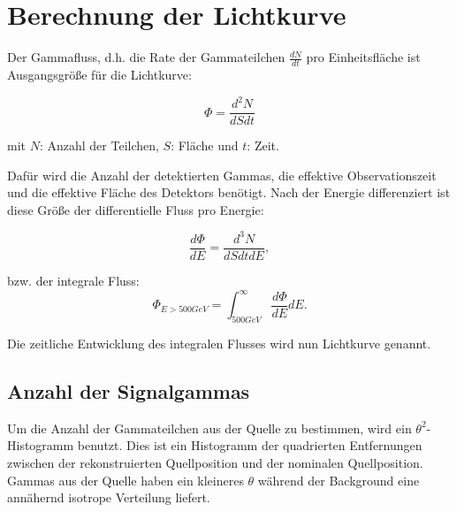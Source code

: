 \section{Berechnung der Lichtkurve}
\label{sec:Lichtkurve}
Der Gammafluss, d.h. die Rate der Gammateilchen $\frac{dN}{dt}$ pro Einheitsfläche ist Ausgangsgröße für die Lichtkurve:

\begin{equation}
 \Phi=\frac{d^2 N}{dS dt} 
\end{equation}
\begin{centering}
  \small{mit $N$: Anzahl der Teilchen, $S$: Fläche und $t$: Zeit.}
 \end{centering}
 
Dafür wird die Anzahl der detektierten Gammas, die effektive Observationszeit und die effektive Fläche des Detektors benötigt.
Nach der Energie differenziert ist diese Größe der differentielle Fluss pro Energie:

\begin{equation}
 \frac{d\Phi}{dE}=\frac{d^3N}{dSdtdE},
\end{equation}

bzw. der integrale Fluss:
\begin{equation}
 \Phi_{E>500GeV}=\int_{500GeV}^{\infty}\frac{d\Phi}{dE}dE.
\end{equation}


Die zeitliche Entwicklung des integralen Flusses wird nun Lichtkurve genannt.

\subsection{Anzahl der Signalgammas}
Um die Anzahl der Gammateilchen aus der Quelle zu bestimmen, wird ein $\theta^2$-Histogramm benutzt.
Dies ist ein Histogramm der quadrierten Entfernungen zwischen der rekonstruierten Quellposition und der nominalen Quellposition.
Gammas aus der Quelle haben ein kleineres $\theta$ während der Background eine annähernd isotrope Verteilung liefert. 

